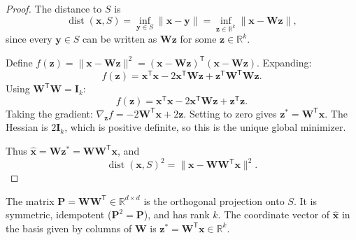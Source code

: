 \begin{proof}
  The distance to $S$ is
  \[
    \operatorname{dist}(\mathbf{x}, S) = \inf_{\mathbf{y} \in S} \|\mathbf{x} - \mathbf{y}\| = \inf_{\mathbf{z} \in \mathbb{R}^k} \|\mathbf{x} - \mathbf{W}\mathbf{z}\|,
  \]
  since every $\mathbf{y} \in S$ can be written as $\mathbf{W}\mathbf{z}$ for some $\mathbf{z} \in \mathbb{R}^k$.

  Define $f(\mathbf{z}) = \|\mathbf{x} - \mathbf{W}\mathbf{z}\|^2 = (\mathbf{x} - \mathbf{W}\mathbf{z})^{\mathsf{T}}(\mathbf{x} - \mathbf{W}\mathbf{z})$. Expanding:
  \[
    f(\mathbf{z}) = \mathbf{x}^{\mathsf{T}}\mathbf{x} - 2\mathbf{x}^{\mathsf{T}}\mathbf{W}\mathbf{z} + \mathbf{z}^{\mathsf{T}}\mathbf{W}^{\mathsf{T}}\mathbf{W}\mathbf{z}.
  \]
  Using $\mathbf{W}^{\mathsf{T}}\mathbf{W} = \mathbf{I}_k$:
  \[
    f(\mathbf{z}) = \mathbf{x}^{\mathsf{T}}\mathbf{x} - 2\mathbf{x}^{\mathsf{T}}\mathbf{W}\mathbf{z} + \mathbf{z}^{\mathsf{T}}\mathbf{z}.
  \]
  Taking the gradient: $\nabla_{\mathbf{z}} f = -2\mathbf{W}^{\mathsf{T}}\mathbf{x} + 2\mathbf{z}$. Setting to zero gives $\mathbf{z}^* = \mathbf{W}^{\mathsf{T}}\mathbf{x}$.
  The Hessian is $2\mathbf{I}_k$, which is positive definite, so this is the unique global minimizer.

  Thus $\widehat{\mathbf{x}} = \mathbf{W}\mathbf{z}^* = \mathbf{W}\mathbf{W}^{\mathsf{T}}\mathbf{x}$, and
  \[
    \operatorname{dist}(\mathbf{x}, S)^2 = \|\mathbf{x} - \mathbf{W}\mathbf{W}^{\mathsf{T}}\mathbf{x}\|^2.
  \]
\end{proof}

\begin{remark}
  The matrix $\mathbf{P} = \mathbf{W}\mathbf{W}^{\mathsf{T}} \in \mathbb{R}^{d \times d}$ is the orthogonal projection onto $S$. It is symmetric, idempotent ($\mathbf{P}^2 = \mathbf{P}$), and has rank $k$.
  The coordinate vector of $\widehat{\mathbf{x}}$ in the basis given by columns of $\mathbf{W}$ is $\mathbf{z}^* = \mathbf{W}^{\mathsf{T}}\mathbf{x} \in \mathbb{R}^k$.

  \begin{center}
  \end{center}
\end{remark}

